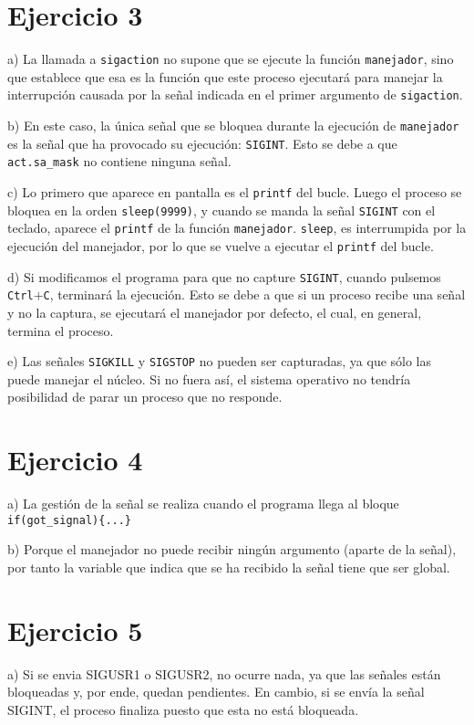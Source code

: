 \documentclass{article}
\begin{document}
\section*{Ejercicio 3}
a) La llamada a \texttt{sigaction} no supone que se ejecute la función \texttt{manejador}, sino que establece que esa es la función que este proceso ejecutará para manejar la interrupción causada por la señal indicada en el primer argumento de \texttt{sigaction}.

b) En este caso, la única señal que se bloquea durante la ejecución de \texttt{manejador} es la señal que ha provocado su ejecución: \texttt{SIGINT}. Esto se debe a que \texttt{act.sa\_mask} no contiene ninguna señal.

c) Lo primero que aparece en pantalla es el \texttt{printf} del bucle. Luego el proceso se bloquea en la orden \texttt{sleep(9999)}, y cuando se manda la señal \texttt{SIGINT} con el teclado, aparece el \texttt{printf} de la función \texttt{manejador}. \texttt{sleep}, es interrumpida por la ejecución del manejador, por lo que se vuelve a ejecutar el \texttt{printf} del bucle.


d) Si modificamos el programa para que no capture \texttt{SIGINT}, cuando pulsemos \texttt{Ctrl}$+$\texttt{C}, terminará la ejecución. Esto se debe a que si un proceso recibe una señal y no la captura, se ejecutará el manejador por defecto, el cual, en general, termina el proceso.

e) Las señales \texttt{SIGKILL} y \texttt{SIGSTOP} no pueden ser capturadas, ya que sólo las puede manejar el núcleo. Si no fuera así, el sistema operativo no tendría posibilidad de parar un proceso que no responde. 

\section*{Ejercicio 4}
a) La gestión de la señal se realiza cuando el programa llega al bloque \texttt{if(got\_signal)\{...\}}

b) Porque el manejador no puede recibir ningún argumento (aparte de la señal), por tanto la variable que indica que se ha recibido la señal tiene que ser global.

\section*{Ejercicio 5}
a) Si se envia SIGUSR1 o SIGUSR2, no ocurre nada, ya que las señales están bloqueadas y, por ende, quedan pendientes. En cambio, si se envía la señal SIGINT, el proceso finaliza puesto que esta no está bloqueada.
\end{document}
